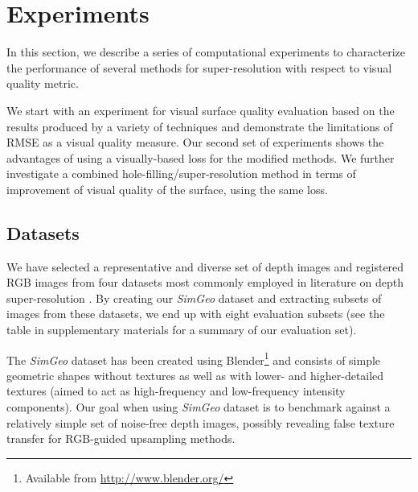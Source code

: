 \section{Experiments}
\label{sec:exper}



In this section, we describe a series of computational experiments
to characterize the performance of several methods for super-resolution with respect to visual 
quality metric. 

We start with an experiment for visual surface quality evaluation based on the results produced by a variety 
of techniques and demonstrate the limitations of RMSE as a visual quality measure. Our second
set of experiments shows the advantages of using a visually-based loss for the modified methods. We further investigate a combined hole-filling/super-resolution method in terms of improvement of visual quality of the surface, using the same loss.

\subsection{Datasets}

We have selected a representative and diverse set of depth images and registered RGB images from 
four datasets most commonly employed in literature on depth super-resolution
\cite{handa:etal:ICRA2014,song2015sun,ferstl2013image,scharstein2014high}. By creating our \emph{SimGeo}
dataset and extracting subsets of images from these datasets, we end up with eight evaluation subsets
(see the table in supplementary materials for a summary of our evaluation set).

The \emph{SimGeo} dataset has been created using 
Blender\footnote{Available from \url{http://www.blender.org/}} and consists of simple geometric
shapes without textures as well as with lower- and higher-detailed textures 
(aimed to act as high-frequency and low-frequency intensity components).
Our goal when using \emph{SimGeo} dataset is to benchmark against
a relatively simple set of noise-free depth images, possibly revealing false texture transfer
for RGB-guided upsampling methods.

